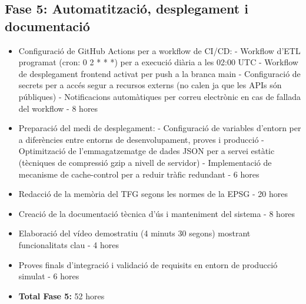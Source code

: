 \subsection{Fase 5: Automatització, desplegament i documentació}
\begin{itemize}
    \item Configuració de GitHub Actions per a workflow de CI/CD:
          - Workflow d'ETL programat (cron: 0 2 * * *) per a execució diària a les 02:00 UTC
          - Workflow de desplegament frontend activat per push a la branca main
          - Configuració de secrets per a accés segur a recursos externs (no calen ja que les APIs són públiques)
          - Notificacions automàtiques per correu electrònic en cas de fallada del workflow - 8 hores
    \item Preparació del medi de desplegament:
          - Configuració de variables d'entorn per a diferències entre entorns de desenvolupament, proves i producció
          - Optimització de l'emmagatzematge de dades JSON per a servei estàtic (tècniques de compressió gzip a nivell de servidor)
          - Implementació de mecanisme de cache-control per a reduir tràfic redundant - 6 hores
    \item Redacció de la memòria del TFG segons les normes de la EPSG - 20 hores
    \item Creació de la documentació tècnica d'ús i manteniment del sistema - 8 hores
    \item Elaboració del vídeo demostratiu (4 minuts 30 segons) mostrant funcionalitats clau - 4 hores
    \item Proves finals d'integració i validació de requisits en entorn de producció simulat - 6 hores
    \item \textbf{Total Fase 5:} 52 hores
\end{itemize}

